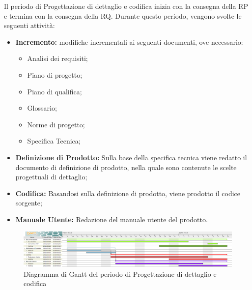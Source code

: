Il periodo di Progettazione di dettaglio e codifica inizia con la consegna della RP e termina con la consegna della RQ.\newline
Durante questo periodo, vengono svolte le seguenti attività:
\begin{itemize}
	\item \textbf{Incremento: }modifiche incrementali ai seguenti documenti, ove necessario:
	\begin{itemize}
		\item Analisi dei requisiti;
		\item Piano di progetto;
		\item Piano di qualifica;
		\item Glossario;
		\item Norme di progetto;
		\item Specifica Tecnica;
	\end{itemize}
	\item \textbf{Definizione di Prodotto: }Sulla base della specifica tecnica viene redatto il documento di definizione di prodotto, nella quale sono contenute le scelte progettuali di dettaglio;
	\item \textbf{Codifica: }Basandosi sulla definizione di prodotto, viene prodotto il codice sorgente;
	\item \textbf{Manuale Utente: }Redazione del manuale utente del prodotto. 
\end{itemize}


\begin{figure}[H]
	\includegraphics[width=1\linewidth]{Pianificazione/Progettazione_Dettaglio_Codififca.png}
	\caption{Diagramma di Gantt del periodo di Progettazione di dettaglio e codifica}
\end{figure}